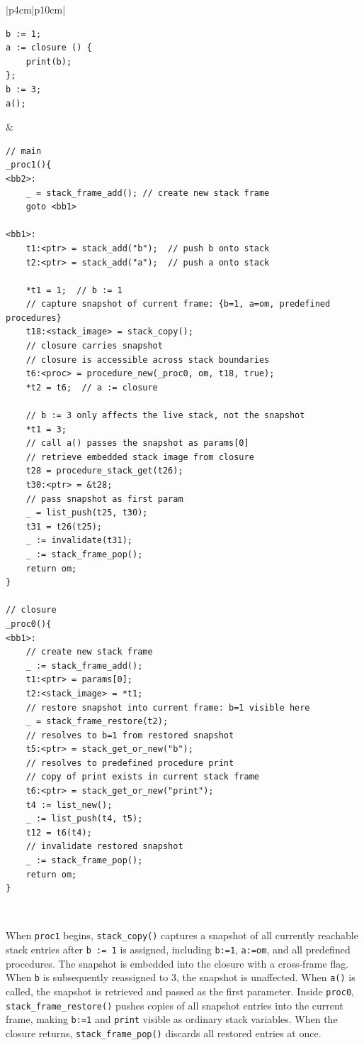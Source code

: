 \begin{table}[H]
	\centering
    \caption{Stack Closure \ac{IR} Example}
	\renewcommand{\arraystretch}{1}
	\begin{tabular}{ |p{4cm}|p{10cm}| }
		\hline
\begin{lstlisting}
b := 1;
a := closure () {
	print(b);
};
b := 3;
a();
\end{lstlisting}
&
\begin{lstlisting}[basicstyle=\ttfamily\tiny]
// main
_proc1(){
<bb2>:
    _ = stack_frame_add(); // create new stack frame
    goto <bb1>

<bb1>:
    t1:<ptr> = stack_add("b");  // push b onto stack
    t2:<ptr> = stack_add("a");  // push a onto stack

    *t1 = 1;  // b := 1
    // capture snapshot of current frame: {b=1, a=om, predefined procedures}
    t18:<stack_image> = stack_copy();
    // closure carries snapshot
    // closure is accessible across stack boundaries
    t6:<proc> = procedure_new(_proc0, om, t18, true);
    *t2 = t6;  // a := closure

    // b := 3 only affects the live stack, not the snapshot
    *t1 = 3;
    // call a() passes the snapshot as params[0]
    // retrieve embedded stack image from closure
    t28 = procedure_stack_get(t26);
    t30:<ptr> = &t28;
    // pass snapshot as first param
    _ = list_push(t25, t30);
    t31 = t26(t25);
    _ := invalidate(t31);
    _ := stack_frame_pop();
    return om;
}

// closure
_proc0(){ 
<bb1>:
    // create new stack frame
    _ := stack_frame_add();
    t1:<ptr> = params[0];
    t2:<stack_image> = *t1;
    // restore snapshot into current frame: b=1 visible here
    _ = stack_frame_restore(t2);
    // resolves to b=1 from restored snapshot
    t5:<ptr> = stack_get_or_new("b");
    // resolves to predefined procedure print
    // copy of print exists in current stack frame
    t6:<ptr> = stack_get_or_new("print");
    t4 := list_new();
    _ := list_push(t4, t5);
    t12 = t6(t4);
    // invalidate restored snapshot
    _ := stack_frame_pop();
    return om;
}
\end{lstlisting}
\\
		\hline
	\end{tabular}
\end{table}

When \texttt{proc1} begins, \texttt{stack\_copy()} captures a snapshot of all currently reachable stack entries after \texttt{b := 1} is assigned, including \texttt{b:=1}, \texttt{a:=om}, and all predefined procedures. The snapshot is embedded into the closure with a cross-frame flag. When \texttt{b} is subsequently reassigned to $3$, the snapshot is unaffected. When \texttt{a()} is called, the snapshot is retrieved and passed as the first parameter. Inside \texttt{proc0}, \texttt{stack\_frame\_restore()} pushes copies of all snapshot entries into the current frame, making \texttt{b:=1} and \texttt{print} visible as ordinary stack variables. When the closure returns, \texttt{stack\_frame\_pop()} discards all restored entries at once.

